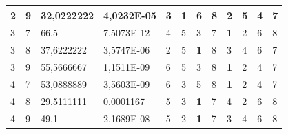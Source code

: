 \documentclass[conference]{IEEEtran}
\begin{document}
\begin{table}[]
\begin{tabular}{|llll|llllllll|}
		\multicolumn{1}{|l|}{2}   & \multicolumn{1}{l|}{9}         & \multicolumn{1}{l|}{32,0222222}    & 4,0232E-05 & \multicolumn{1}{l|}{3}          & \multicolumn{1}{l|}{\textbf{1}} & \multicolumn{1}{l|}{6}          & \multicolumn{1}{l|}{8}   & \multicolumn{1}{l|}{2}          & \multicolumn{1}{l|}{5}          & \multicolumn{1}{l|}{4}   & 7                      \\ \hline
		\multicolumn{1}{|l|}{3}   & \multicolumn{1}{l|}{7}         & \multicolumn{1}{l|}{66,5}          & 7,5073E-12 & \multicolumn{1}{l|}{4}          & \multicolumn{1}{l|}{5}          & \multicolumn{1}{l|}{3}          & \multicolumn{1}{l|}{7}   & \multicolumn{1}{l|}{\textbf{1}} & \multicolumn{1}{l|}{2}          & \multicolumn{1}{l|}{6}   & 8                      \\ \hline
		\multicolumn{1}{|l|}{3}   & \multicolumn{1}{l|}{8}         & \multicolumn{1}{l|}{37,6222222}    & 3,5747E-06 & \multicolumn{1}{l|}{2}          & \multicolumn{1}{l|}{5}          & \multicolumn{1}{l|}{\textbf{1}} & \multicolumn{1}{l|}{8}   & \multicolumn{1}{l|}{3}          & \multicolumn{1}{l|}{4}          & \multicolumn{1}{l|}{6}   & 7                      \\ \hline
		\multicolumn{1}{|l|}{3}   & \multicolumn{1}{l|}{9}         & \multicolumn{1}{l|}{55,5666667}    & 1,1511E-09 & \multicolumn{1}{l|}{6}          & \multicolumn{1}{l|}{5}          & \multicolumn{1}{l|}{3}          & \multicolumn{1}{l|}{8}   & \multicolumn{1}{l|}{\textbf{1}} & \multicolumn{1}{l|}{2}          & \multicolumn{1}{l|}{4}   & 7                      \\ \hline
		\multicolumn{1}{|l|}{4}   & \multicolumn{1}{l|}{7}         & \multicolumn{1}{l|}{53,0888889}    & 3,5603E-09 & \multicolumn{1}{l|}{6}          & \multicolumn{1}{l|}{3}          & \multicolumn{1}{l|}{5}          & \multicolumn{1}{l|}{8}   & \multicolumn{1}{l|}{\textbf{1}} & \multicolumn{1}{l|}{2}          & \multicolumn{1}{l|}{4}   & 7                      \\ \hline
		\multicolumn{1}{|l|}{4}   & \multicolumn{1}{l|}{8}         & \multicolumn{1}{l|}{29,5111111}    & 0,0001167  & \multicolumn{1}{l|}{5}          & \multicolumn{1}{l|}{3}          & \multicolumn{1}{l|}{\textbf{1}} & \multicolumn{1}{l|}{7}   & \multicolumn{1}{l|}{4}          & \multicolumn{1}{l|}{2}          & \multicolumn{1}{l|}{6}   & 8                      \\ \hline
		\multicolumn{1}{|l|}{4}   & \multicolumn{1}{l|}{9}         & \multicolumn{1}{l|}{49,1}          & 2,1689E-08 & \multicolumn{1}{l|}{5}          & \multicolumn{1}{l|}{2}          & \multicolumn{1}{l|}{\textbf{1}} & \multicolumn{1}{l|}{7}   & \multicolumn{1}{l|}{3}          & \multicolumn{1}{l|}{4}          & \multicolumn{1}{l|}{6}   & 8                      \\ \hline

\end{tabular}
\end{table}
\end{document}
